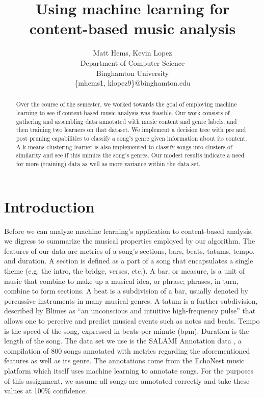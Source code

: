 \documentclass[11pt, twocolumn]{article}
\begin{document}
\title{Using machine learning for content-based music analysis}
\author{Matt Hems, Kevin Lopez\\
  Department of Computer Science\\
  Binghamton University\\
\{mhems1, klopez9\}@binghamton.edu}
\maketitle

\begin{abstract}
Over the course of the semester, we worked towards the goal of employing machine
learning to see if content-based music analysis was feasible. Our work consists
of gathering and assembling data annotated with music content and genre labels,
and then training two learners on that dataset. We implement a decision tree
with pre and post pruning capabilities to classify a song’s genre given
information about its content. A k-means clustering learner is also implemented
to classify songs into clusters of similarity and see if this mimics the
song’s genres. Our modest results indicate a need for more (training) data as
well as more variance within the data set.
\end{abstract}

\section{Introduction}
    Before we can analyze machine learning’s application to content-based
analysis, we digress to summarize the musical properties employed by our
algorithm. The features of our data are metrics of a song’s sections, bars,
beats, tatums, tempo, and duration. A section is defined as a part of a song
that encapsulates a single theme (e.g. the intro, the bridge, verses, etc.). A
bar, or measure, is a unit of music that combine to make up a musical idea, or
phrase; phrases, in turn, combine to form sections. A beat is a subdivision of
a bar, usually denoted by percussive instruments in many musical genres. A
tatum is a further subdivision, described by Blimes \cite{blimes} as “an
unconscious and intuitive high-frequency pulse” that allows one to perceive
and predict musical events such as notes and beats. Tempo is the speed of the
song, expressed in beats per minute (bpm). Duration is the length of the song.
    The data set we use is the SALAMI Annotation data \cite{mcgill}, a
compilation of 800 songs annotated with metrics regarding the aforementioned
features as well as its genre. The annotations come from the EchoNest music
platform which itself uses machine learning to annotate songs. For the purposes
of this assignment, we assume all songs are annotated correctly and take these
values at 100\% confidence.
\end{document}

